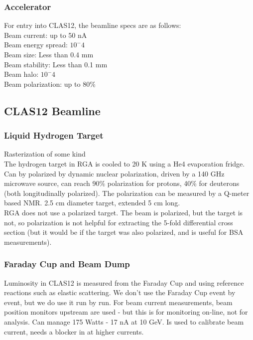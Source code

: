             \subsubsection{Accelerator}
                    For entry into CLAS12, the beamline specs are as follows:\\
                    Beam current: up to 50 nA\\
                    Beam energy spread: $10^-4$\\
                    Beam size: Less than 0.4 mm\\
                    Beam stability: Less than 0.1 mm\\
                    Beam halo: $10^-4$\\
                    Beam polarization: up to 80\%\\
    
    
            
        \subsection{CLAS12 Beamline}
            \subsubsection{Liquid Hydrogen Target}
                Rasterization of some kind
                \\
                \indent The hydrogen target in RGA is cooled to 20 K using a He4 evaporation fridge. Can by polarized by dynamic nuclear polarization, driven by a 140 GHz microwave source, can reach 90\% polarization for protons, 40\% for deuterons (both longitudinally polarized). The polarization can be measured by a Q-meter based NMR. 2.5 cm diameter target, extended 5 cm long. \\
                \indent RGA does not use a polarized target. The beam is polarized, but the target is not, so polarization is not helpful for extracting the 5-fold differential cross section (but it would be if the target was also polarized, and is useful for BSA measurements).
            
            \subsubsection{Faraday Cup and Beam Dump}
            Luminosity in CLAS12 is measured from the Faraday Cup and using reference reactions such as elastic scattering. We don't use the Faraday Cup event by event, but we do use it run by run. For beam current measurements, beam position monitors upstream are used - but this is for monitoring on-line, not for analysis.
                       Can manage 175 Watts - 17 nA at 10 GeV. Is used to calibrate beam current, needs a blocker in at higher currents.